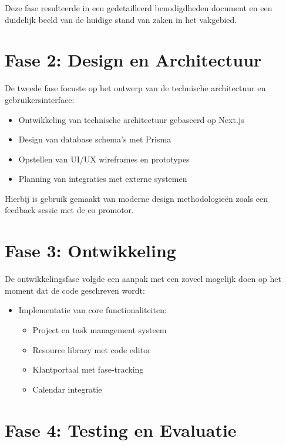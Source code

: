 Deze fase resulteerde in een gedetailleerd benodigdheden document en een duidelijk beeld van de huidige stand van zaken in het vakgebied.

\section{Fase 2: Design en Architectuur}
\label{sec:fase2}

De tweede fase focuste op het ontwerp van de technische architectuur en gebruikersinterface:

\begin{itemize}
    \item Ontwikkeling van technische architectuur gebaseerd op Next.js
    \item Design van database schema's met Prisma
    \item Opstellen van UI/UX wireframes en prototypes
    \item Planning van integraties met externe systemen
\end{itemize}

Hierbij is gebruik gemaakt van moderne design methodologieën zoals een feedback sessie met de co promotor.

\section{Fase 3: Ontwikkeling}
\label{sec:fase3}

De ontwikkelingsfase volgde een aanpak met een zoveel mogelijk doen op het moment dat de code geschreven wordt:

\begin{itemize}
    \item Implementatie van core functionaliteiten:
    \begin{itemize}
        \item Project en task management systeem
        \item Resource library met code editor
        \item Klantportaal met fase-tracking
        \item Calendar integratie
    \end{itemize}
\end{itemize}

\section{Fase 4: Testing en Evaluatie}
\label{sec:fase4}

